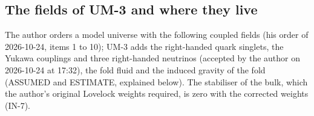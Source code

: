 \documentclass[
  10pt,
]{article}
\begin{document}
\hypertarget{the-fields-of-um-3-and-where-they-live}{%
\subsection{The fields of UM-3 and where they
live}\label{the-fields-of-um-3-and-where-they-live}}

The author orders a model universe with the following coupled fields
(his order of 2026-10-24, items 1 to 10); UM-3 adds the right-handed
quark singlets, the Yukawa couplings and three right-handed neutrinos
(accepted by the author on 2026-10-24 at 17:32), the fold fluid and the
induced gravity of the fold (ASSUMED and ESTIMATE, explained below). The
stabiliser of the bulk, which the author's original Lovelock weights
required, is zero with the corrected weights (IN-7).
\end{document}
